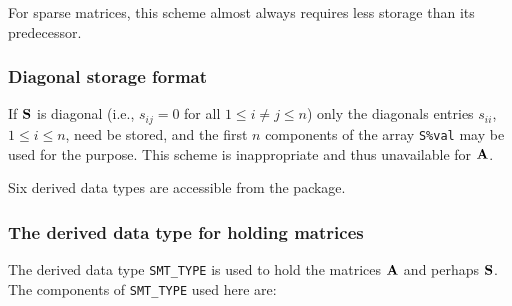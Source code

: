 \documentclass{galahad}
\begin{document}
For sparse matrices, this scheme almost always requires less storage than
its predecessor.

\subsubsection{Diagonal storage format}\label{diagonal}
If ${\mathbf{S}}$ is diagonal (i.e., $s_{ij} = 0$ for all $1 \leq i \neq j \leq n$)
only the diagonals entries $s_{ii}$, $1 \leq i \leq n$,  need be stored,
and the first $n$ components of the array {\tt S\%val} may be used for
the purpose. This scheme is inappropriate and thus unavailable for ${\mathbf{A}}$.








\galtypes
Six derived data types are accessible from the package.


\subsubsection{The derived data type for holding matrices}\label{typesmt}
The derived data type {\tt SMT\_TYPE} is used to hold the matrices ${\mathbf{A}}$
and perhaps ${\mathbf{S}}$.
The components of {\tt SMT\_TYPE} used here are:
\end{document}
